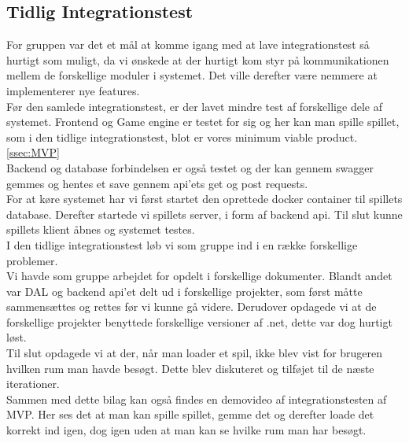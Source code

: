 \subsection{Tidlig Integrationstest}
For gruppen var det et mål at komme igang med at lave integrationstest så hurtigt som muligt, da vi ønskede at der hurtigt kom styr på kommunikationen mellem de forskellige moduler i systemet. Det ville derefter være nemmere at implementerer nye features.\\

Før den samlede integrationstest, er der lavet mindre test af forskellige dele af systemet.
Frontend og Game engine er testet for sig og her kan man spille spillet, som i den tidlige integrationstest, blot er vores minimum viable product. \autoref{ssec:MVP}\\

Backend og database forbindelsen er også testet og der kan gennem swagger gemmes og hentes et save gennem api'ets get og post requests.\\

For at køre systemet har vi først startet den oprettede docker container til spillets database. Derefter startede vi spillets server, i form af backend api. Til slut kunne spillets klient åbnes og systemet testes.\\

I den tidlige integrationstest løb vi som gruppe ind i en række forskellige problemer.\\
Vi havde som gruppe arbejdet for opdelt i forskellige dokumenter. Blandt andet var DAL og backend api'et delt ud i forskellige projekter, som først måtte sammensættes og rettes før vi kunne gå videre.
Derudover opdagede vi at de forskellige projekter benyttede forskellige versioner af .net, dette var dog hurtigt løst.\\
Til slut opdagede vi at der, når man loader et spil, ikke blev vist for brugeren hvilken rum man havde besøgt. Dette blev diskuteret og tilføjet til de næste iterationer.\\

Sammen med dette bilag kan også findes en demovideo af integrationstesten af MVP. Her ses det at man kan spille spillet, gemme det og derefter loade det korrekt ind igen, dog igen uden at man kan se hvilke rum man har besøgt.
